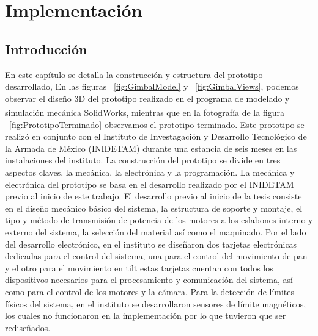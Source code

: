 
\chapter{Implementaci\'on}\label{sec:Implementacion}

\section{Introducci\'on}

En este cap\'{i}tulo se detalla la construcci\'{o}n y estructura del prototipo desarrollado, En las figuras ~\ref{fig:GimbalModel} y ~\ref{fig:GimbalViews}, podemos observar el dise\~{n}o 3D del prototipo realizado en el programa de modelado y simulaci\'{o}n mec\'{a}nica SolidWorks\textsuperscript{\textregistered}, mientras que en la fotograf\'{i}a de la figura ~\ref{fig:PrototipoTerminado} observamos el prototipo terminado. Este prototipo se realiz\'{o} en conjunto con el Instituto de Investagaci\'{o}n y Desarrollo Tecnol\'{o}gico de la Armada de M\'{e}xico (INIDETAM) durante una estancia de seis meses en las instalaciones del instituto. La construcci\'{o}n del prototipo se divide en tres aspectos claves, la mec\'{a}nica, la electr\'{o}nica y la programaci\'{o}n. La mec\'{a}nica y electr\'{o}nica del prototipo se basa en el desarrollo realizado por el INIDETAM  previo al inicio de este trabajo. El desarrollo previo al inicio de la tesis consiste en el dise\~{n}o mec\'{a}nico b\'{a}sico del sistema, la estructura de soporte y montaje, el tipo y m\'{e}todo de transmisi\'{o}n de potencia de los motores a los eslabones interno y externo del sistema, la selecci\'{o}n del material as\'{i} como el maquinado. Por el lado del desarrollo electr\'{o}nico, en el instituto se dise\~{n}aron dos tarjetas electr\'{o}nicas dedicadas para el control del sistema, una para el control del movimiento de pan y el otro para el movimiento en tilt estas tarjetas cuentan con todos los dispositivos necesarios para el procesamiento y comunicaci\'{o}n del sistema, as\'{i} como para el control de los motores y la c\'{a}mara. Para la detecci\'{o}n de l\'{i}mites f\'{i}sicos del sistema, en el instituto se desarrollaron sensores de l\'{i}mite magn\'{e}ticos, los cuales no funcionaron en la implementaci\'{o}n por lo que tuvieron que ser redise\~{n}ados.          

